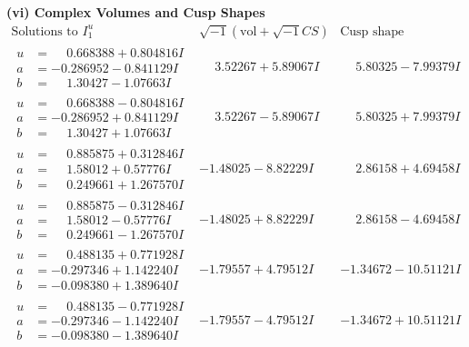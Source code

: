\documentclass[1p]{elsarticle_modified}
\theoremstyle{definition}
\newcommand{\I}{\sqrt{-1}}
\begin{document}
\newpage\flushleft \textbf{(vi) Complex Volumes and Cusp Shapes}
$$\begin{array}{c|c|c}  
\text{Solutions to }I^u_{1}& \I (\text{vol} + \sqrt{-1}CS) & \text{Cusp shape}\\
 \hline 
\begin{aligned}
u &= \phantom{-}0.668388 + 0.804816 I \\
a &= -0.286952 - 0.841129 I \\
b &= \phantom{-}1.30427 - 1.07663 I\end{aligned}
 & \phantom{-}3.52267 + 5.89067 I & \phantom{-}5.80325 - 7.99379 I \\ \hline\begin{aligned}
u &= \phantom{-}0.668388 - 0.804816 I \\
a &= -0.286952 + 0.841129 I \\
b &= \phantom{-}1.30427 + 1.07663 I\end{aligned}
 & \phantom{-}3.52267 - 5.89067 I & \phantom{-}5.80325 + 7.99379 I \\ \hline\begin{aligned}
u &= \phantom{-}0.885875 + 0.312846 I \\
a &= \phantom{-}1.58012 + 0.57776 I \\
b &= \phantom{-}0.249661 + 1.267570 I\end{aligned}
 & -1.48025 - 8.82229 I & \phantom{-}2.86158 + 4.69458 I \\ \hline\begin{aligned}
u &= \phantom{-}0.885875 - 0.312846 I \\
a &= \phantom{-}1.58012 - 0.57776 I \\
b &= \phantom{-}0.249661 - 1.267570 I\end{aligned}
 & -1.48025 + 8.82229 I & \phantom{-}2.86158 - 4.69458 I \\ \hline\begin{aligned}
u &= \phantom{-}0.488135 + 0.771928 I \\
a &= -0.297346 + 1.142240 I \\
b &= -0.098380 + 1.389640 I\end{aligned}
 & -1.79557 + 4.79512 I & -1.34672 - 10.51121 I \\ \hline\begin{aligned}
u &= \phantom{-}0.488135 - 0.771928 I \\
a &= -0.297346 - 1.142240 I \\
b &= -0.098380 - 1.389640 I\end{aligned}
 & -1.79557 - 4.79512 I & -1.34672 + 10.51121 I \\ \hline\begin{aligned}

\end{aligned}
\end{array}$$
\end{document}
